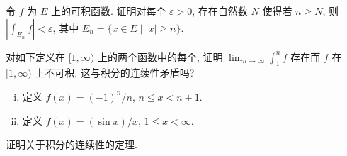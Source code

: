 \documentclass[../../main.tex]{subfiles}
\begin{document}
\begin{exercise}\label{exercise:ch04-37}
令 $f$ 为 $E$ 上的可积函数. 证明对每个 $\varepsilon>0$, 存在自然数 $N$ 使得若 $n\geqslant N$, 则 $\left|\int_{E_{n}}f\right|<\varepsilon$, 其中 $E_{n}=\{x\in E\mid|x|\geqslant n\}$.
\end{exercise}

\begin{exercise}\label{exercise:ch04-38}
对如下定义在 $[1,\infty)$ 上的两个函数中的每个, 证明 $\lim_{n\to\infty}\int_{1}^{n}f$ 存在而 $f$ 在 $[1,\infty)$ 上不可积. 这与积分的连续性矛盾吗?
\begin{enumerate}[(i)]
\item 定义 $f(x)=(-1)^{n}/n$, $n\leqslant x<n+1$.
\item 定义 $f(x)=(\sin x)/x$, $1\leqslant x<\infty$.
\end{enumerate}
\end{exercise}

\begin{exercise}\label{exercise:ch04-39}
证明关于积分的连续性的定理.
\end{exercise}
\end{document}
